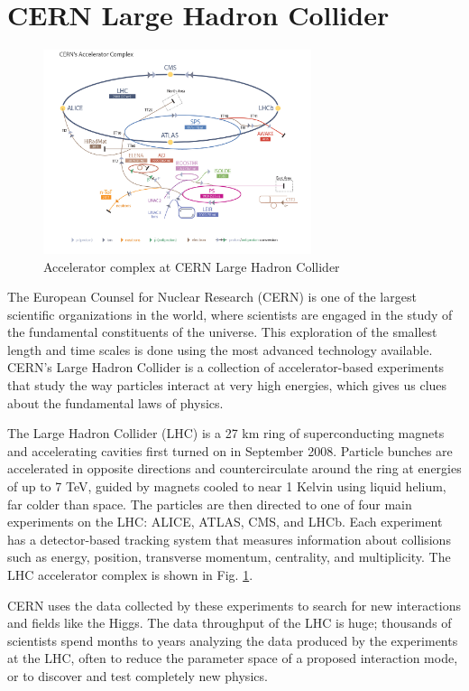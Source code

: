 \section{CERN Large Hadron Collider}
\begin{figure}[H]
    \centering
    \includegraphics[width=0.7\textwidth]{figures/CERN/LHC_accelerator_complex.jpg}
    \caption{Accelerator complex at CERN Large Hadron Collider}
    \label{fig:CERN_Accelerator_Complex}
\end{figure}

The European Counsel for Nuclear Research (CERN) is one of the largest scientific organizations in the world, where scientists are engaged in the study of the fundamental constituents of the universe. This exploration of the smallest length and time scales is done using the most advanced technology available. CERN's Large Hadron Collider is a collection of accelerator-based experiments that study the way particles interact at very high energies, which gives us clues about the fundamental laws of physics. 

The Large Hadron Collider (LHC) is a 27 km ring of superconducting magnets and accelerating cavities first turned on in September 2008. Particle bunches are accelerated in opposite directions and countercirculate around the ring at energies of up to 7 TeV, guided by magnets cooled to near 1 Kelvin using liquid helium, far colder than space. The particles are then directed to one of four main experiments on the LHC: ALICE, ATLAS, CMS, and LHCb. Each experiment has a detector-based tracking system that measures information about collisions such as energy, position, transverse momentum, centrality, and multiplicity. The LHC accelerator complex is shown in Fig. \ref{fig:CERN_Accelerator_Complex}.

CERN uses the data collected by these experiments to search for new interactions and fields like the Higgs. The data throughput of the LHC is huge; thousands of scientists spend months to years analyzing the data produced by the experiments at the LHC, often to reduce the parameter space of a proposed interaction mode, or to discover and test completely new physics.


